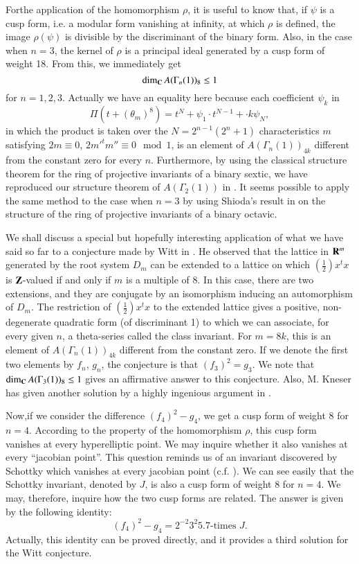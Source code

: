 For\pageoriginale the application of the homomorphism $\rho$, it is useful to know that, if $\psi$ is a cusp form, i.e. a modular form vanishing at infinity, at which $\rho$ is defined, the image $\rho(\psi)$ is divisible by the discriminant of the binary form. Also, in the case when $n=3$, the kernel of $\rho$ is a principal ideal generated by a cusp form of weight 18. From this, we immediately get
$$
\dim_{\mathbf{C}}A(\Gamma_{n}(1))_{8}\leq 1
$$
for $n=1,2,3$. Actually we have an equality here because each coefficient $\psi_{k}$ in
$$
\Pi (t+(\theta_{m})^{8})=t^{N}+\psi_{1}\cdot t^{N-1}+\cdot k\psi_{N},
$$
in which the product is taken over the $N=2^{n-1}(2^{n}+1)$ characteristics $m$ satisfying $2m\equiv 0$, $2{m'}^{t}m''\equiv 0\mod 1$, is an element of $A(\Gamma_{n}(1))_{4k}$ different from the constant zero for every $n$. Furthermore, by using the classical structure theorem for the ring of projective invariants of a binary sextic, we have reproduced our structure theorem of $A(\Gamma_{2}(1))$ in \cite{art12-key12}. It seems possible to apply the same method to the case when $n=3$ by using Shioda's result in \cite{art12-key21} on the structure of the ring of projective invariants of a binary octavic.

We shall discuss a special but hopefully interesting application of what we have said so far to a conjecture made by Witt in \cite{art12-key27}. He observed that the lattice in $\mathbf{R}^{m}$ generated by the root system $D_{m}$ can be extended to a lattice on which $(\frac{1}{2})x^{t}x$ is $\mathbf{Z}$-valued if and only if $m$ is a multiple of 8. In this case, there are two extensions, and they are conjugate by an isomorphism inducing an automorphism of $D_{m}$. The restriction of $(\frac{1}{2})x^{t}x$ to the extended lattice gives a positive, non-degenerate quadratic form (of discriminant 1) to which we can associate, for every given $n$, a theta-series called the class invariant. For $m=8k$, this is an element of $A(\Gamma_{n}(1))_{4k}$ different from the constant zero. If we denote the first two elements by $f_{n}$, $g_{n}$, the conjecture is that $(f_{3})^{2}=g_{3}$. We note that $\dim_{\mathbf{C}}A(\Gamma_{3}(1))_{8}\leq 1$ gives an affirmative answer to this conjecture. Also, M. Kneser has given another solution by a highly ingenious argument in \cite{art12-key14}.

Now,\pageoriginale if we consider the difference $(f_{4})^{2}-g_{4}$, we get a cusp form of weight 8 for $n=4$. According to the property of the homomorphism $\rho$, this cusp form vanishes at every hyperelliptic point. We may inquire whether it also vanishes at every ``jacobian point''. This question reminds us of an invariant discovered by Schottky which vanishes at every jacobian point (c.f. \cite{art12-key19}). We can see easily that the Schottky invariant, denoted by $J$, is also a cusp form of weight $8$ for $n=4$. We may, therefore, inquire how the two cusp forms are related. The answer is given by the following identity:
$$
(f_{4})^{2}-g_{4}=2^{-2}3^{2}5.7\text{-times } J.
$$
Actually, this identity can be proved directly, and it provides a third solution for the Witt conjecture.


